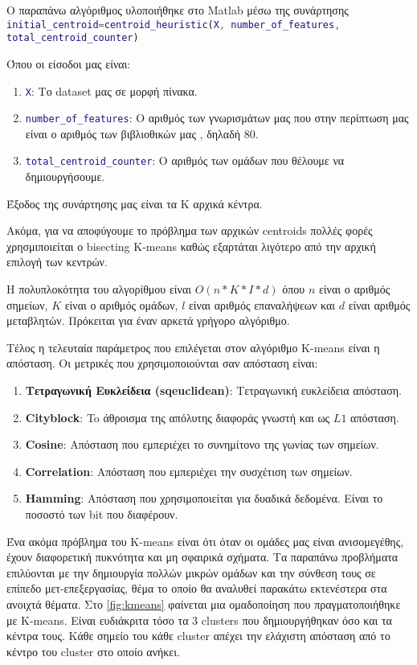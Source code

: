 Ο παραπάνω αλγόριθμος υλοποιήθηκε στο Matlab μέσω της συνάρτησης
\lstinline[language=MATLAB, breaklines=true]!initial_centroid=centroid_heuristic(X, number_of_features, total_centroid_counter)!

Όπου οι είσοδοι μας είναι:
\begin{enumerate}
    \item \lstinline[language=MATLAB]!X!: Το dataset μας σε μορφή πίνακα.
    \item \lstinline[language=MATLAB]!number_of_features!: Ο αριθμός των γνωρισμάτων μας που στην περίπτωση μας είναι ο αριθμός των βιβλιοθικών μας , δηλαδή 80.
    \item \lstinline[language=MATLAB]!total_centroid_counter!: Ο αριθμός των ομάδων που θέλουμε να δημιουργήσουμε.
\end{enumerate}

Έξοδος της συνάρτησης μας είναι τα Κ αρχικά κέντρα.


Ακόμα, για να αποφύγουμε το πρόβλημα των αρχικών centroids πολλές φορές χρησμιποιείται ο bisecting K-means καθώς εξαρτάται λιγότερο από την αρχική επιλογή των κεντρών.

Η πολυπλοκότητα του αλγορίθμου είναι $ O(n*K*I*d)$ όπου $n$ είναι ο αριθμός σημείων, $Κ$ είναι ο αριθμός ομάδων, $l$ είναι αριθμός επαναλήψεων και $d$ είναι αριθμός μεταβλητών. Πρόκειται για έναν αρκετά γρήγορο αλγόριθμο.

Τέλος η τελευταία παράμετρος που επιλέγεται στον αλγόριθμο K-means είναι η απόσταση. Οι μετρικές που χρησιμοποιούνται σαν απόσταση είναι:
\begin{enumerate}
    \item \textbf{Τετραγωνική Ευκλείδεια (sqeuclidean)}: Τετραγωνική ευκλείδεια απόσταση.
    \item \textbf{Cityblock}: To άθροισμα της απόλυτης διαφοράς γνωστή και ως $L1$ απόσταση.
    \item \textbf{Cosine}: Απόσταση που εμπεριέχει το συνημίτονο της γωνίας των σημείων.
    \item \textbf{Correlation}: Απόσταση που εμπεριέχει την συσχέτιση των σημείων.
    \item \textbf{Hamming}: Απόσταση που χρησιμοποιείται για δυαδικά δεδομένα. Είναι το ποσοστό των bit που διαφέρουν.
\end{enumerate}

Ένα ακόμα πρόβλημα του K-means είναι ότι όταν οι ομάδες μας είναι ανισομεγέθης, έχουν διαφορετική πυκνότητα και μη σφαιρικά σχήματα. Τα παραπάνω προβλήματα επιλύονται με την δημιουργία πολλών μικρών ομάδων και την σύνθεση τους σε επίπεδο μετ-επεξεργασίας, θέμα το οποίο θα αναλυθεί παρακάτω εκτενέστερα στα ανοιχτά θέματα.
Στο \hyperref[fig:kmeans]{\figurename{} \ref{fig:kmeans}}
φαίνεται μια ομαδοποίηση που πραγματοποιήθηκε με K-means. Είναι ευδιάκριτα τόσο τα 3 clusters που δημιουργήθηκαν όσο και τα κέντρα τους. Κάθε σημείο του κάθε cluster απέχει την ελάχιστη απόσταση από το κέντρο του cluster στο οποίο ανήκει.

